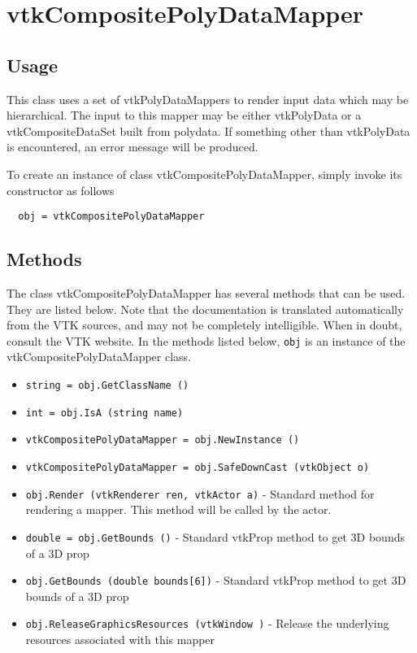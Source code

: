 \section{vtkCompositePolyDataMapper}

\subsection{Usage}

 This class uses a set of vtkPolyDataMappers to render input data
 which may be hierarchical. The input to this mapper may be
 either vtkPolyData or a vtkCompositeDataSet built from 
 polydata. If something other than vtkPolyData is encountered,
 an error message will be produced.

To create an instance of class vtkCompositePolyDataMapper, simply
invoke its constructor as follows
\begin{verbatim}
  obj = vtkCompositePolyDataMapper
\end{verbatim}
\subsection{Methods}

The class vtkCompositePolyDataMapper has several methods that can be used.
  They are listed below.
Note that the documentation is translated automatically from the VTK sources,
and may not be completely intelligible.  When in doubt, consult the VTK website.
In the methods listed below, \verb|obj| is an instance of the vtkCompositePolyDataMapper class.
\begin{itemize}
\item  \verb|string = obj.GetClassName ()|

\item  \verb|int = obj.IsA (string name)|

\item  \verb|vtkCompositePolyDataMapper = obj.NewInstance ()|

\item  \verb|vtkCompositePolyDataMapper = obj.SafeDownCast (vtkObject o)|

\item  \verb|obj.Render (vtkRenderer ren, vtkActor a)| -  Standard method for rendering a mapper. This method will be 
 called by the actor.

\item  \verb|double = obj.GetBounds ()| -  Standard vtkProp method to get 3D bounds of a 3D prop

\item  \verb|obj.GetBounds (double bounds[6])| -  Standard vtkProp method to get 3D bounds of a 3D prop

\item  \verb|obj.ReleaseGraphicsResources (vtkWindow )| -  Release the underlying resources associated with this mapper  

\end{itemize}
